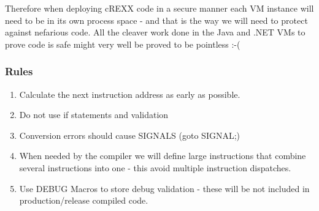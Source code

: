 Therefore when deploying cREXX code in a secure manner each VM instance will need to be in its own process space - and that is the way we will need to protect against nefarious code. All the cleaver work done in the Java and .NET VMs to prove code is safe might very well be proved to be pointless :-(

\subsubsection{Rules}

\begin{enumerate}
\item Calculate the next instruction address as early as possible.

\item Do not use \textquotedbl{}if\textquotedbl{} statements and validation

\item Conversion errors should cause SIGNALS (\textquotedbl{}goto SIGNAL;\textquotedbl{})

\item When needed by the compiler we will define large instructions that combine several instructions into one - this avoid multiple instruction dispatches.

\item Use DEBUG Macros to store debug validation - these will be not included in production/release compiled code.

\end{enumerate}
